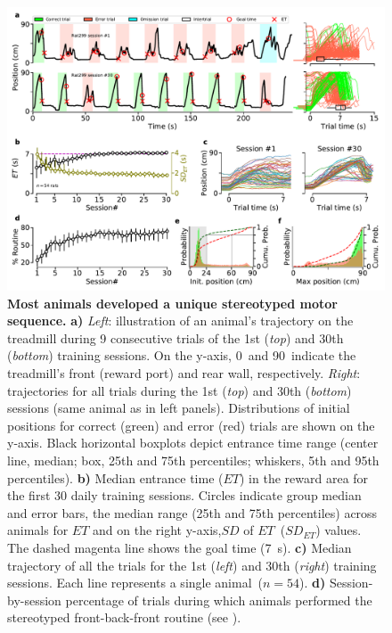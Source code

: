 \begin{figure}[bt!]
    \begin{center}
      \includegraphics[width=\textwidth]{ch-time/figures/CtrlTrd.pdf}
      \caption[Control Condition]
      {\textbf{Most animals developed a unique stereotyped motor sequence.}
      \textbf{a)}
      \textit{Left}: illustration of an animal's trajectory on the treadmill during 9 consecutive trials of the 1st (\textit{top}) and 30th (\textit{bottom}) training sessions.
      On the y-axis, 0~and 90~indicate the treadmill's front (reward port) and rear wall, respectively.
      \textit{Right}: trajectories for all trials during the 1st (\textit{top}) and 30th (\textit{bottom}) sessions (same animal as in left panels).
      Distributions of initial positions for correct (green) and error (red) trials are shown on the y-axis.
      Black horizontal boxplots depict entrance time range (center line, median; box, 25th and 75th percentiles; whiskers, 5th and 95th percentiles).
      \textbf{b)}
      Median entrance time ($ET$) in the reward area for the first 30 daily training sessions.
      Circles indicate group median and error bars, the median range (25th and 75th percentiles) across animals for $ET$ and on the right y-axis,$SD$ of $ET$~($SD_{ET}$) values.
      The dashed magenta line shows the goal time (7~s).
      \textbf{c)}
      Median trajectory of all the trials for the 1st (\textit{left}) and 30th (\textit{right}) training sessions.
      Each line represents a single animal~($n=54$).
      \textbf{d)}
      Session-by-session percentage of trials during which animals performed the stereotyped front-back-front routine (see ).
}
\end{center}
\end{figure}
